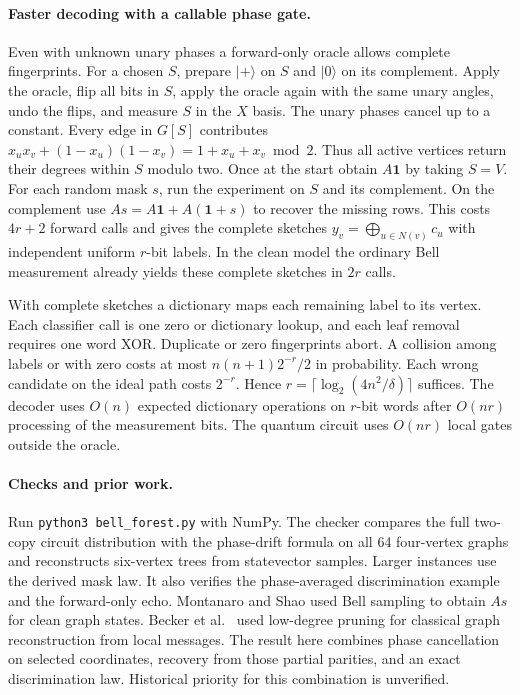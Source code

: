 \documentclass[11pt]{article}
\newcommand{\ket}[1]{\lvert #1\rangle}
\begin{document}
\paragraph{Faster decoding with a callable phase gate.}
Even with unknown unary phases a forward-only oracle allows complete
fingerprints. For a chosen $S$, prepare $\ket{+}$ on $S$ and $\ket0$ on
its complement. Apply the oracle, flip all bits in $S$, apply the oracle
again with the same unary angles, undo the flips, and measure $S$ in the
$X$ basis. The unary phases cancel up to a constant. Every edge in
$G[S]$ contributes
$x_ux_v+(1-x_u)(1-x_v)=1+x_u+x_v\bmod2$. Thus all active vertices
return their degrees within $S$ modulo two. Once at the start obtain
$A\mathbf1$ by taking $S=V$. For each random mask $s$, run the experiment
on $S$ and its complement. On the complement use
$As=A\mathbf1+A(\mathbf1+s)$ to recover the missing rows.
This costs $4r+2$ forward calls and gives the complete sketches
$y_v=\bigoplus_{u\in N(v)}c_u$ with independent uniform $r$-bit labels.
In the clean model the ordinary Bell measurement already yields these
complete sketches in $2r$ calls.

With complete sketches a dictionary maps each remaining label to its
vertex. Each classifier call is one zero or dictionary lookup, and each
leaf removal requires one word XOR. Duplicate or zero fingerprints abort.
A collision among labels or with zero costs at most $n(n+1)2^{-r}/2$ in
probability. Each wrong candidate on the ideal path costs $2^{-r}$.
Hence $r=\lceil\log_2(4n^2/\delta)\rceil$ suffices. The decoder uses
$O(n)$ expected dictionary operations on $r$-bit words after $O(nr)$
processing of the measurement bits. The quantum circuit uses $O(nr)$
local gates outside the oracle.

\paragraph{Checks and prior work.}
Run \texttt{python3 bell\_forest.py} with NumPy. The checker compares the
full two-copy circuit distribution with the phase-drift formula on all 64
four-vertex graphs and reconstructs six-vertex trees from statevector
samples. Larger instances use the derived mask law. It also verifies the
phase-averaged discrimination example and the forward-only echo.
Montanaro and Shao \cite{ms} used Bell sampling to obtain $As$ for clean
graph states. Becker et al.\ \cite{becker} used low-degree pruning for
classical graph reconstruction from local messages. The result here
combines phase cancellation on selected coordinates, recovery from those
partial parities, and an exact discrimination law. Historical priority
for this combination is unverified.
\end{document}
